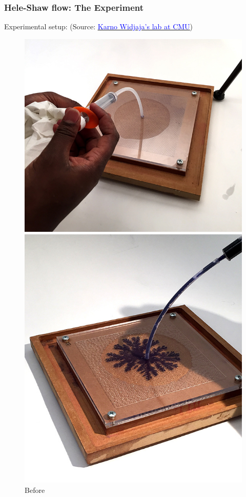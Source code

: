 \documentclass{beamer}
\begin{document}
\begin{frame}
    \frametitle{Hele-Shaw flow: The Experiment}
    
    Experimental setup: (Source: \href{https://karnowidjaja.com/Hele-Shaw-Experiment}{\underline{\textcolor{blue}{Karno Widjaja's lab at CMU}}})
    \begin{figure}[!tbp]
    \centering
    \begin{minipage}[b]{0.4\textwidth}
    \includegraphics[scale=0.24]{cell-1.jpg}
    \caption{Before}
    \end{minipage}
    \hspace{-10pt}
    \begin{minipage}[b]{0.4\textwidth}
    \includegraphics[scale=0.25]{cell-2.jpg}

\end{minipage}
\end{figure}
\end{frame}
\end{document}
